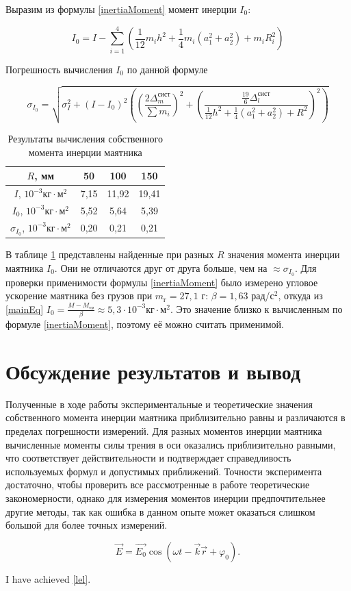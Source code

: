 \documentclass[a4paper,12pt]{article} %
\begin{document}
Выразим из формулы \eqref{inertiaMoment} момент инерции $ I_0 $:

\begin{equation}
    I_0 = I - \sum\limits_{i = 1}^4{(\dfrac{1}{12}m_ih^2 + \dfrac{1}{4}m_i(a_1^2 + a_2^2) + m_iR_i^2)}
\end{equation}

Погрешность вычисления $ I_0 $ по данной формуле

\begin{equation}
    \sigma_{I_0} = \sqrt{\sigma_I^2 + (I - I_0)^2((\frac{2\Delta_m^\text{сист}}{\sum m_i})^2 + (\frac{\frac{19}{6}\Delta_l^\text{сист}}{\frac{1}{12}h^2 + \frac{1}{4}(a_1^2 + a_2^2) + R^2})^2)}
\end{equation}

\begin{table}[]
    \centering
    \begin{tabular}{|c|c|c|c|} \hline
        $ R $, мм & 50 & 100 & 150 \\ \hline
        $ I $, $ 10^{-3} \text{кг} \cdot \text{м}^2 $ & 7,15 & 11,92 & 19,41 \\ \hline
        $ I_0 $, $ 10^{-3} \text{кг} \cdot \text{м}^2 $ & 5,52 & 5,64 & 5,39 \\ \hline
        $ \sigma_{I_0} $, $ 10^{-3} \text{кг} \cdot \text{м}^2 $ & 0,20 & 0,21 & 0,21 \\ \hline
    \end{tabular}
    \caption{Результаты вычисления собственного момента инерции маятника}
    \label{tab:aboba}
\end{table}

В таблице \ref{tab:aboba} представлены найденные при разных $ R $ значения момента инерции маятника $ I_0 $. Они не отличаются друг от друга больше, чем на $ \approx \sigma_{I_0} $. Для проверки применимости формулы \eqref{inertiaMoment} было измерено угловое ускорение маятника без грузов при $ m_\text{г} = 27,1 $ г: $ \beta = 1,63 $ рад/$ \text{с}^2 $, откуда из \eqref{mainEq} $ I_0 = \frac{M - M_\text{тр}}{\beta} \approx 5,3 \cdot 10^{-3} \text{кг} \cdot \text{м}^2 $. Это значение близко к вычисленным по формуле \eqref{inertiaMoment}, поэтому её можно считать применимой.

\section{Обсуждение результатов и вывод}

Полученные в ходе работы экспериментальные и теоретические значения собственного момента инерции маятника приблизительно равны и различаются в пределах погрешности измерений. Для разных моментов инерции маятника вычисленные моменты силы трения в оси оказались приблизительно равными, что соответствует действительности и подтверждает справедливость используемых формул и допустимых приближений. Точности эксперимента достаточно, чтобы проверить все рассмотренные в работе теоретические закономерности, однако для измерения моментов инерции предпочтительнее другие методы, так как ошибка в данном опыте может оказаться слишком большой для более точных измерений.

\begin{equation}\label{lel}
    \Vec{E} = \Vec{E_0}\cos(\omega t - \vec{k}\vec{r} + \varphi_0).
\end{equation}

I have achieved \ref{lel}.
\end{document}
